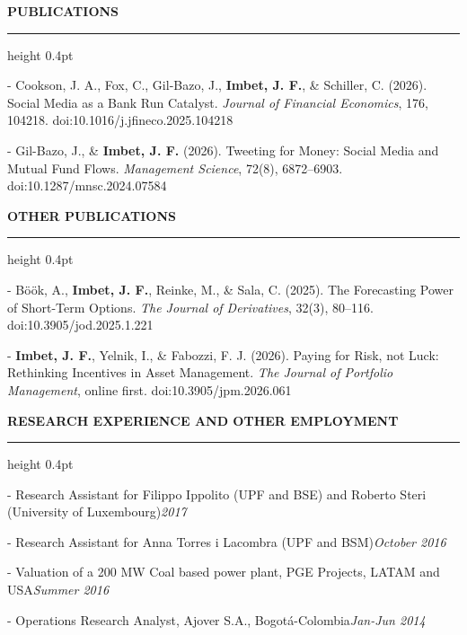 \documentclass[11pt,letterpaper]{article}
\makeatletter
\newcommand{\cvsection}[1]{%
  \par\vspace{12.80pt}%
  \textbf{#1}\par\nobreak
  \vspace{6.08pt}\hrule height 0.4pt\nobreak\vspace{6.9pt}\nobreak}
\newenvironment{cvbody}
  {\begin{list}{}{%
      \@beginparpenalty\@M      %
      \setlength{\leftmargin}{1.5em}%
      \setlength{\rightmargin}{0pt}%
      \setlength{\labelwidth}{0pt}%
      \setlength{\labelsep}{0pt}%
      \setlength{\listparindent}{0pt}%
      \setlength{\itemindent}{0pt}%
      \setlength{\topsep}{0pt}%
      \setlength{\partopsep}{0pt}%
      \setlength{\parsep}{0pt}%
      \setlength{\itemsep}{0pt}}%
   \item\relax}
  {\end{list}}
\newcommand{\dated}[2]{#1\hfill\textit{#2}\par}
\makeatother
\begin{document}
\newpage
\cvsection{PUBLICATIONS}
\begin{cvbody}
- Cookson, J. A., Fox, C., Gil-Bazo, J., \textbf{Imbet, J. F.}, \& Schiller, C. (2026). Social Media as a Bank Run Catalyst. \textit{Journal of Financial Economics}, 176, 104218. doi:10.1016/j.jfineco.2025.104218\par
- Gil-Bazo, J., \& \textbf{Imbet, J. F.} (2026). Tweeting for Money: Social Media and Mutual Fund Flows. \textit{Management Science}, 72(8), 6872--6903. doi:10.1287/mnsc.2024.07584\par
\end{cvbody}

\cvsection{OTHER PUBLICATIONS}
\begin{cvbody}
- Böök, A., \textbf{Imbet, J. F.}, Reinke, M., \& Sala, C. (2025). The Forecasting Power of Short-Term Options. \textit{The Journal of Derivatives}, 32(3), 80--116. doi:10.3905/jod.2025.1.221\par
- \textbf{Imbet, J. F.}, Yelnik, I., \& Fabozzi, F. J. (2026). Paying for Risk, not Luck: Rethinking Incentives in Asset Management. \textit{The Journal of Portfolio Management}, online first. doi:10.3905/jpm.2026.061\par
\end{cvbody}

\cvsection{RESEARCH EXPERIENCE AND OTHER EMPLOYMENT}
\begin{cvbody}
\dated{- Research Assistant for Filippo Ippolito (UPF and BSE) and Roberto Steri (University of Luxembourg)}{2017}
\dated{- Research Assistant for Anna Torres i Lacombra (UPF and BSM)}{October 2016}
\dated{- Valuation of a 200 MW Coal based power plant, PGE Projects, LATAM and USA}{Summer 2016}
\dated{- Operations Research Analyst, Ajover S.A., Bogotá-Colombia}{Jan-Jun 2014}
\end{cvbody}
\end{document}
